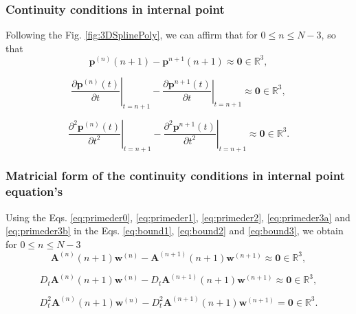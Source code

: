 \subsubsection{Continuity conditions in internal point}
Following the Fig. \ref{fig:3DSplinePoly}, 
we can affirm that for $0 \leq n\leq N-3$,
so that
\begin{equation}\label{eq:bound1}
\mathbf{p}^{(n)}(n+1)-\mathbf{p}^{n+1}(n+1)
\approx
\mathbf{0}\in \mathbb{R}^{3},
\end{equation}

\begin{equation}\label{eq:bound2}
\left.\frac{\partial\mathbf{p}^{(n)}(t)}{\partial t}\right|_{t=n+1}
-
\left.\frac{\partial\mathbf{p}^{n+1}(t)}{\partial t}\right|_{t=n+1}
\approx\mathbf{0}\in \mathbb{R}^{3},
\end{equation}

\begin{equation}\label{eq:bound3}
\left.\frac{\partial^{2}\mathbf{p}^{(n)}(t)}{\partial t^{2}}\right|_{t=n+1}
-
\left.\frac{\partial^{2}\mathbf{p}^{n+1}(t)}{\partial t^{2}}\right|_{t=n+1}
\approx\mathbf{0}\in \mathbb{R}^{3}.
\end{equation}

\subsubsection{Matricial form of the continuity conditions in internal point equation's}
Using %
the Eqs. \ref{eq:primeder0}, \ref{eq:primeder1}, \ref{eq:primeder2}, \ref{eq:primeder3a} and \ref{eq:primeder3b} in 
the Eqs. \ref{eq:bound1}, \ref{eq:bound2} and \ref{eq:bound3},
we obtain for $0 \leq n\leq N-3$
\begin{equation}
 \mathbf{A}^{(n)}(n+1) \mathbf{w}^{(n)} - \mathbf{A}^{(n+1)}(n+1) \mathbf{w}^{(n+1)} 
 \approx
 \mathbf{0} \in \mathbb{R}^{3},
\end{equation}

\begin{equation}
D_{t}\mathbf{A}^{(n)}(n+1)
\mathbf{w}^{(n)}
-
D_{t}\mathbf{A}^{(n+1)}(n+1)
\mathbf{w}^{(n+1)}
\approx\mathbf{0}\in \mathbb{R}^{3},
\end{equation}


\begin{equation}
D_{t}^{2}\mathbf{A}^{(n)}(n+1)
\mathbf{w}^{(n)}
-
D_{t}^{2}\mathbf{A}^{(n+1)}(n+1)
\mathbf{w}^{(n+1)}
=\mathbf{0}\in \mathbb{R}^{3}.
\end{equation}

